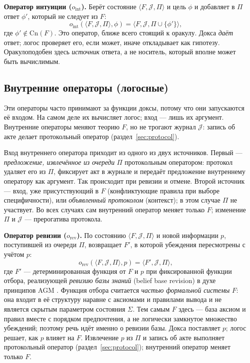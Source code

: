 \documentclass[12pt,a4paper]{article}
\begin{document}
\textbf{Оператор интуиции ($o_{\text{int}}$).} Берёт состояние
$\langle F, \mathcal{J}, \Pi \rangle$ и цель $\phi$ и добавляет в $\Pi$
ответ $\phi'$, который не следует из $F$:
\[
o_{\text{int}}(\langle F, \mathcal{J}, \Pi \rangle, \phi)
= \langle F, \mathcal{J}, \Pi \cup \{\phi'\} \rangle,
\]
где $\phi' \notin \mathrm{Cn}(F)$. Это оператор, ближе всего стоящий к
оракулу. Докса \emph{даёт} ответ; логос проверяет его, если может, иначе
откладывает как гипотезу. Оракулоподобен здесь \emph{источник} ответа, а не
носитель, который вполне может быть вычислимым.

\subsection{Внутренние операторы (логосные)}
\label{sec:internal}

Эти операторы часто принимают за функции доксы, потому что они запускаются
её входом. На самом деле их вычисляет логос; вход --- лишь их аргумент.
Внутренние операторы меняют теорию $F$, но не трогают журнал $\mathcal{J}$:
запись об акте делает протокольный оператор (раздел~\ref{sec:protocol}).

Вход внутреннего оператора приходит из одного из двух источников.
Первый --- \emph{предложение, извлечённое из очереди} $\Pi$ протокольным
оператором: протокол удаляет его из $\Pi$, фиксирует акт в журнале и
передаёт предложение внутреннему оператору как аргумент. Так происходит
при ревизии и отмене. Второй источник --- вход, уже присутствующий в $F$
(конфликтующие правила при выборе специфичности), или \emph{объявленный
протоколом} (контекст); в этом случае $\Pi$ не участвует. Во всех случаях
сам внутренний оператор меняет только $F$; изменение $\Pi$ и $\mathcal{J}$
--- прерогатива протокола.

\textbf{Оператор ревизии ($o_{\text{rev}}$).} По состоянию
$\langle F, \mathcal{J}, \Pi \rangle$ и новой информации $p$, поступившей
из очереди $\Pi$, возвращает $F'$, в которой убеждения пересмотрены с
учётом $p$:
\[
o_{\text{rev}}(\langle F, \mathcal{J}, \Pi \rangle, p)
= \langle F', \mathcal{J}, \Pi \rangle,
\]
где $F'$ --- детерминированная функция от $F$ и $p$ при фиксированной
функции отбора, реализующей \emph{ревизию базы знаний} (belief base
revision) в духе принципов AGM \cite{agm}. Функция отбора считается
\emph{частью формальной системы} $F$: она входит в её структуру наравне
с аксиомами и правилами вывода и не является скрытым параметром состояния
$\Sigma$. Тем самым $F$ здесь --- база аксиом и правил вместе с порядком
предпочтения, а не логически замкнутое множество убеждений; поэтому речь
идёт именно о ревизии базы. Докса поставляет $p$; логос решает, как $p$
влияет на $F$. Извлечение $p$ из $\Pi$ и запись об акте выполняет
протокольный оператор (раздел~\ref{sec:protocol}); внутренний оператор
меняет только $F$.
\end{document}

